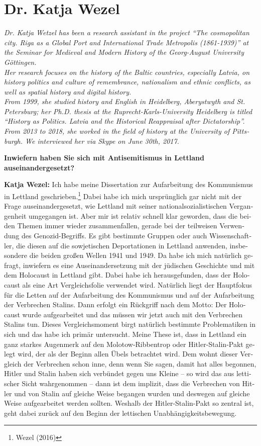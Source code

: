 
\section{Dr. Katja Wezel}
\begin{otherlanguage}{ngerman}
\textit{Dr. Katja Wetzel has been a research assistant in the project ``The cosmopolitan city. Riga as a Global Port and International Trade Metropolis (1861-1939)'' at the Seminar for Medieval and Modern History of the Georg-August University Göttingen.\\
Her research focuses on the history of the Baltic countries, especially Latvia, on history politics and culture of remembrance, nationalism and ethnic conflicts, as well as spatial history and digital history.\\
From 1999, she studied history and English in Heidelberg, Aberystwyth and St. Petersburg; her Ph.D. thesis  at the Ruprecht-Karls-University Heidelberg is titled ``History as Politics. Latvia and the Historical Reappraisal after Dictatorship''. From 2013 to 2018, she worked in the field of history at the University of Pittsburgh. We interviewed her via Skype on June 30th, 2017.}\par 
\vspace*{2em}
\textbf{Inwiefern haben Sie sich mit Antisemitismus in Lettland auseinandergesetzt?}

\textbf{Katja Wezel:} Ich habe meine Dissertation zur Aufarbeitung des Kommunismus in Lettland geschrieben.\footnote{Wezel (2016)} Dabei habe ich mich ursprünglich gar nicht mit der Frage auseinandergesetzt, wie Lettland mit seiner nationalsozialistischen Vergangenheit umgegangen ist. Aber mir ist relativ schnell klar geworden, dass die beiden Themen immer wieder zusammenfallen, gerade bei der teilweisen Verwendung des Genozid-Begriffs. Es gibt bestimmte Gruppen oder auch Wissenschaftler, die diesen auf die sowjetischen Deportationen in Lettland anwenden, insbesondere die beiden großen Wellen 1941 und 1949. Da habe ich mich natürlich gefragt, inwiefern es eine Auseinandersetzung mit der jüdischen Geschichte und mit dem Holocaust in Lettland gibt. Dabei habe ich herausgefunden, dass der Holocaust als eine Art Vergleichsfolie verwendet wird. Natürlich liegt der Hauptfokus für die Letten auf der Aufarbeitung des Kommunismus und auf der Aufarbeitung der Verbrechen Stalins. Dann erfolgt ein Rückgriff nach dem Motto: Der Holocaust wurde aufgearbeitet und das müssen wir jetzt auch mit den Verbrechen Stalins tun. Dieses Vergleichsmoment birgt natürlich bestimmte Problematiken in sich und das habe ich primär untersucht. Meine These ist, dass in Lettland ein ganz starkes Augenmerk auf den Molotow-Ribbentrop oder Hitler-Stalin-Pakt gelegt wird, der als der Beginn allen Übels betrachtet wird. Dem wohnt dieser Vergleich der Verbrechen schon inne, denn wenn Sie sagen, damit hat alles begonnen, Hitler und Stalin haben sich verbündet gegen uns Kleine – so wird das aus lettischer Sicht wahrgenommen – dann ist dem implizit, dass die Verbrechen von Hitler und von Stalin auf gleiche Weise begangen wurden und deswegen auf gleiche Weise aufgearbeitet werden sollten. Weshalb der Hitler-Stalin-Pakt so zentral ist, geht dabei zurück auf den Beginn der lettischen Unabhängigkeitsbewegung. 


\end{otherlanguage}
